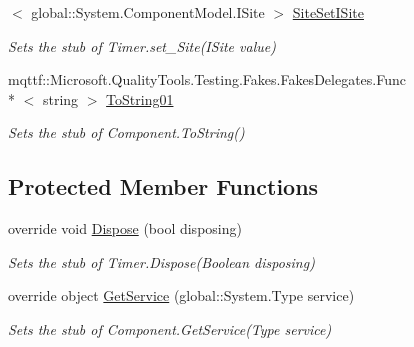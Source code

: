 \begin{DoxyCompactItemize}
$<$ global\-::\-System.\-Component\-Model.\-I\-Site $>$ \hyperlink{class_system_1_1_timers_1_1_fakes_1_1_stub_timer_a9da70e08cc0a0b41635047a1a83d5dc1}{Site\-Set\-I\-Site}
\begin{DoxyCompactList}\small\item\em Sets the stub of Timer.\-set\-\_\-\-Site(\-I\-Site value)\end{DoxyCompactList}\item 
mqttf\-::\-Microsoft.\-Quality\-Tools.\-Testing.\-Fakes.\-Fakes\-Delegates.\-Func\\*
$<$ string $>$ \hyperlink{class_system_1_1_timers_1_1_fakes_1_1_stub_timer_affdc055dca4eff918edb2681c8f7798c}{To\-String01}
\begin{DoxyCompactList}\small\item\em Sets the stub of Component.\-To\-String()\end{DoxyCompactList}\end{DoxyCompactItemize}
\subsection*{Protected Member Functions}
\begin{DoxyCompactItemize}
\item 
override void \hyperlink{class_system_1_1_timers_1_1_fakes_1_1_stub_timer_a3694e80a5677ac657544e6259022bb4a}{Dispose} (bool disposing)
\begin{DoxyCompactList}\small\item\em Sets the stub of Timer.\-Dispose(\-Boolean disposing)\end{DoxyCompactList}\item 
override object \hyperlink{class_system_1_1_timers_1_1_fakes_1_1_stub_timer_ac94431744feb8ffb9ef580b6abadfed6}{Get\-Service} (global\-::\-System.\-Type service)
\begin{DoxyCompactList}\small\item\em Sets the stub of Component.\-Get\-Service(\-Type service)\end{DoxyCompactList}\end{DoxyCompactItemize}

